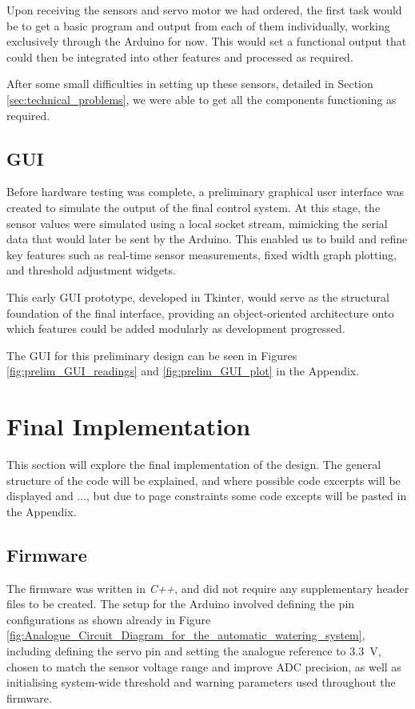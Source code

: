 \documentclass[a4paper,11pt]{article}
\begin{document}
Upon receiving the sensors and servo motor we had ordered,
the first task would be to get a basic program and output from each of them individually,
working exclusively through the Arduino for now.
This would set a functional output that could then be integrated into other features
and processed as required.

After some small difficulties in setting up these sensors,
detailed in Section \ref{sec:technical_problems},
we were able to get all the components functioning as required.

\subsection{GUI}
\label{sec:gui_simulation}

Before hardware testing was complete, a preliminary graphical user interface was created 
to simulate the output of the final control system. 
At this stage, the sensor values were simulated using a local socket stream, mimicking 
the serial data that would later be sent by the Arduino. This enabled us to build and 
refine key features such as real-time sensor measurements,
fixed width graph plotting, and threshold adjustment widgets.

This early GUI prototype, developed in Tkinter, would serve as the structural 
foundation of the final interface, providing an object-oriented architecture 
onto which features could be added modularly as development progressed.

The GUI for this preliminary design can be seen in 
Figures \ref{fig:prelim_GUI_readings} and \ref{fig:prelim_GUI_plot} in the Appendix.

\section{Final Implementation}
\label{sec:final_implementation}

This section will explore the final implementation of the design.
The general structure of the code will be explained, 
and where possible code excerpts will be displayed and ...,
but due to page constraints some code excepts will be pasted in the Appendix.

\subsection{Firmware}
\label{sec:firmware}

The firmware was written in \textit{C++}, and did not require any supplementary 
header files to be created.
The setup for the Arduino involved defining the pin configurations
as shown already in 
Figure \ref{fig:Analogue_Circuit_Diagram_for_the_automatic_watering_system},
including defining the servo pin and 
setting the analogue reference to \SI{3.3}{\volt}, 
chosen to match the sensor voltage range and improve ADC precision, 
as well as initialising system-wide threshold and 
warning parameters used throughout the firmware.
\end{document}
